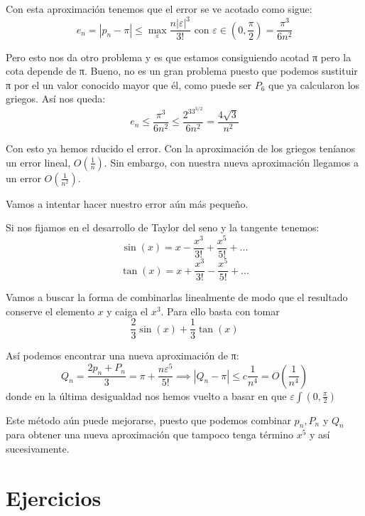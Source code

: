 \documentclass{apuntes}
\begin{document}
Con esta aproximación tenemos que el error se ve acotado como sigue:
\[e_n = |p_n-π| \leq \max_ε \frac{n|ε|^3}{3!} \text{ con } ε \in \left( 0, \frac{π}{2} \right) = \frac{π^3}{6n^2}\]

Pero esto nos da otro problema y es que estamos consiguiendo acotad π pero la cota depende de π. Bueno, no es un gran problema puesto que podemos sustituir π por el un valor conocido mayor que él, como puede ser $P_6$ que ya calcularon los griegos. Así nos queda:
\[e_n \leq \frac{π^3}{6n^2} \leq \frac{2^33^{3/2}}{6n^2}=\frac{4\sqrt{3}}{n^2}\]

Con esto ya hemos rducido el error. Con la aproximación de los griegos teníanos un error lineal, $O\left( \frac{1}{n}\right)$. Sin embargo, con nuestra nueva aproximación llegamos a un error $O\left( \frac{1}{n^2}\right)$.

Vamos a intentar hacer nuestro error aún más pequeño.

Si nos fijamos en el desarrollo de Taylor del seno y la tangente tenemos:
\[\sin(x)=x-\frac{x^3}{3!}+\frac{x^5}{5!}+...\]
\[\tan(x)=x+\frac{x^3}{3!}-\frac{x^5}{5!}+...\]

Vamos a buscar la forma de combinarlas linealmente de modo que el resultado conserve el elemento $x$ y caiga el $x^3$. Para ello basta con tomar 
\[\frac{2}{3}\sin(x)+\frac{1}{3}\tan(x)\]

Así podemos encontrar una nueva aproximación de π:
\[Q_n = \frac{2p_n+P_n}{3} = π + \frac{nε^5}{5!} \implies |Q_n-π| \leq c\frac{1}{n^4}=O\left( \frac{1}{n^4}\right)\]
donde en la última desigualdad nos hemos vuelto a basar en que $ε\int\left( 0, \frac{π}{2} \right)$

Este método aún puede mejorarse, puesto que podemos combinar $p_n,P_n$ y $Q_n$ para obtener una nueva aproximación que tampoco tenga término $x^5$ y así sucesivamente.

\appendix
\chapter{Ejercicios}

\printindex
\end{document}
